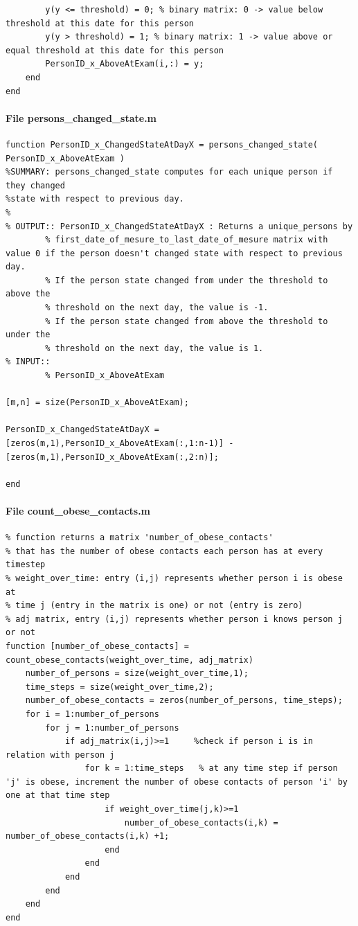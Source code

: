 \documentclass[11pt]{article}
\begin{document}
\begin{verbatim}
        y(y <= threshold) = 0; % binary matrix: 0 -> value below threshold at this date for this person
        y(y > threshold) = 1; % binary matrix: 1 -> value above or equal threshold at this date for this person
        PersonID_x_AboveAtExam(i,:) = y;
    end
end

\end{verbatim}

\paragraph{File persons\_changed\_state.m}
\begin{verbatim}
function PersonID_x_ChangedStateAtDayX = persons_changed_state( PersonID_x_AboveAtExam )
%SUMMARY: persons_changed_state computes for each unique person if they changed
%state with respect to previous day.
%
% OUTPUT:: PersonID_x_ChangedStateAtDayX : Returns a unique_persons by
        % first_date_of_mesure_to_last_date_of_mesure matrix with value 0 if the person doesn't changed state with respect to previous day.
        % If the person state changed from under the threshold to above the
        % threshold on the next day, the value is -1.
        % If the person state changed from above the threshold to under the
        % threshold on the next day, the value is 1.
% INPUT::
        % PersonID_x_AboveAtExam

[m,n] = size(PersonID_x_AboveAtExam);

PersonID_x_ChangedStateAtDayX = [zeros(m,1),PersonID_x_AboveAtExam(:,1:n-1)] - [zeros(m,1),PersonID_x_AboveAtExam(:,2:n)];

end

\end{verbatim}

\paragraph{File count\_obese\_contacts.m}
\begin{verbatim}
% function returns a matrix 'number_of_obese_contacts'
% that has the number of obese contacts each person has at every timestep
% weight_over_time: entry (i,j) represents whether person i is obese at
% time j (entry in the matrix is one) or not (entry is zero)
% adj matrix, entry (i,j) represents whether person i knows person j or not
function [number_of_obese_contacts] = count_obese_contacts(weight_over_time, adj_matrix)
    number_of_persons = size(weight_over_time,1);
    time_steps = size(weight_over_time,2);
    number_of_obese_contacts = zeros(number_of_persons, time_steps);
    for i = 1:number_of_persons
        for j = 1:number_of_persons    
            if adj_matrix(i,j)>=1     %check if person i is in relation with person j
                for k = 1:time_steps   % at any time step if person 'j' is obese, increment the number of obese contacts of person 'i' by one at that time step
                    if weight_over_time(j,k)>=1
                        number_of_obese_contacts(i,k) = number_of_obese_contacts(i,k) +1; 
                    end
                end
            end
        end
    end
end

\end{verbatim}
\end{document}
